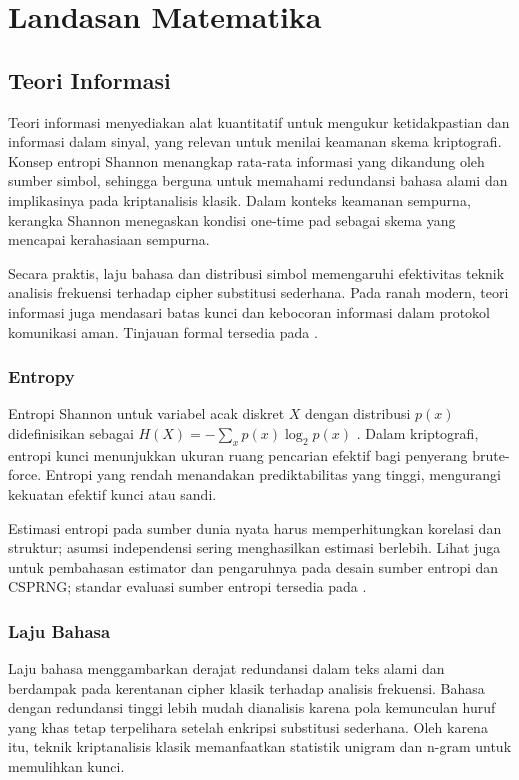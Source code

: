 \documentclass[../main.tex]{subfiles}
\begin{document}
\chapter{Landasan Matematika}

\section{Teori Informasi}
Teori informasi menyediakan alat kuantitatif untuk mengukur ketidakpastian dan informasi dalam sinyal, yang relevan untuk menilai keamanan skema kriptografi. Konsep entropi Shannon menangkap rata-rata informasi yang dikandung oleh sumber simbol, sehingga berguna untuk memahami redundansi bahasa alami dan implikasinya pada kriptanalisis klasik. Dalam konteks keamanan sempurna, kerangka Shannon menegaskan kondisi one-time pad sebagai skema yang mencapai kerahasiaan sempurna.

Secara praktis, laju bahasa dan distribusi simbol memengaruhi efektivitas teknik analisis frekuensi terhadap cipher substitusi sederhana. Pada ranah modern, teori informasi juga mendasari batas kunci dan kebocoran informasi dalam protokol komunikasi aman. Tinjauan formal tersedia pada \textcite{menezes1996handbook}.

\subsection{Entropy}
Entropi Shannon untuk variabel acak diskret \(X\) dengan distribusi \(p(x)\) didefinisikan sebagai \(H(X)= -\sum_x p(x) \log_2 p(x)\) \parencite{shannon1948}. Dalam kriptografi, entropi kunci menunjukkan ukuran ruang pencarian efektif bagi penyerang brute-force. Entropi yang rendah menandakan prediktabilitas yang tinggi, mengurangi kekuatan efektif kunci atau sandi.

Estimasi entropi pada sumber dunia nyata harus memperhitungkan korelasi dan struktur; asumsi independensi sering menghasilkan estimasi berlebih. Lihat juga \textcite{mackay2003itila} untuk pembahasan estimator dan pengaruhnya pada desain sumber entropi dan CSPRNG; standar evaluasi sumber entropi tersedia pada \textcite{nist80090b}.

\subsection{Laju Bahasa}
Laju bahasa menggambarkan derajat redundansi dalam teks alami dan berdampak pada kerentanan cipher klasik terhadap analisis frekuensi. Bahasa dengan redundansi tinggi lebih mudah dianalisis karena pola kemunculan huruf yang khas tetap terpelihara setelah enkripsi substitusi sederhana. Oleh karena itu, teknik kriptanalisis klasik memanfaatkan statistik unigram dan n-gram untuk memulihkan kunci.
\end{document}
